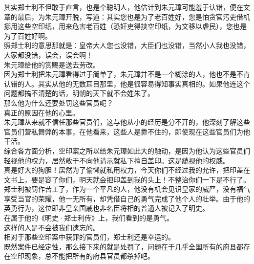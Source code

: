 \begin{multicols}{\theparacolNo}
其实郑士利不但敢于直言，也是个聪明人，他估计到朱元璋可能羞于认错，便在文章的最后，为朱元璋开脱，写道：其实您也是为了老百姓好，您是怕贪官污吏借机挪用这些空印纸，用来危害老百姓（恐奸吏得挟空印纸，为文移以虐民），您也是为了百姓好啊。\\

照郑士利的意思那就是：皇帝大人您也没错，大臣们也没错，当然小人我也没错，大家都没错，误会，误会啊！\\

朱元璋给他的赏赐是送去劳改。\\

因为郑士利把朱元璋看得过于简单了，朱元璋并不是一个糊涂的人，他也不是不肯认错的人。其实从他的无数耳目那里，他是很容易得知事实真相的。如果他连这个问题都搞不清楚的话，明朝的天下就不会姓朱了。\\

那么他为什么还要处罚这些官员呢？\\

真正的原因在他的心里。\\

朱元璋从来就不信任那些官员们，这与他从小的经历是分不开的，他深刻了解这些官员们营私舞弊的本事，在他看来，这些人是靠不住的，即使现在这些官员们为他干活。\\

综合各方面分析，空印案之所以给朱元璋如此大的触动，是因为他认为这些官员们轻视他的权力，居然敢于不向他请示就私下擅自盖印。这是藐视他的权威。\\

真是好大的狗胆！居然为了偷懒就私用权力，今天你们不经过我的允许，把印盖在文书上，要是容了你们，明天就会把印盖到我的头上！不整治你们一下是不行了。\\

郑士利被罚作苦工了，作为一个平凡的人，他没有机会见识皇家的威严，没有福气享受当官的荣耀，他一无所有，却凭借自己的勇气完成了他个人的壮举。由于他的英勇行为，这位即非皇亲国戚也非名臣将相的普通人被记入了明史。\\

在属于他的《明史·郑士利传》上，我们看到的是勇气。\\

这样的人是不会被我们遗忘的。\\

相对于那些空印案中获罪的官员们，郑士利还是幸运的。\\

既然案件已经定性，那么接下来的就是处罚了，问题在于几乎全国所有的府县都存在空印现象，总不能把所有的府县官员都杀掉吧。\\


\end{multicols}
